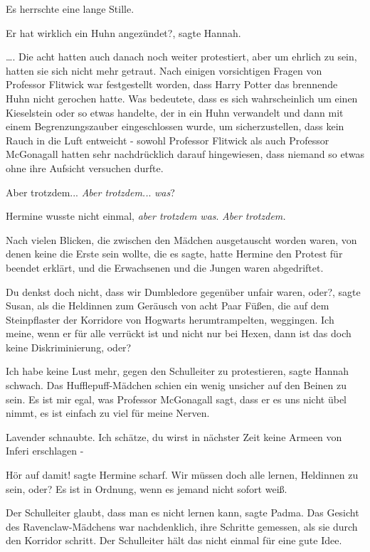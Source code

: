 Es herrschte eine lange Stille.

\glqq Er hat wirklich ein Huhn angezündet?\grqq{}, sagte Hannah.

…. Die acht hatten auch danach noch weiter protestiert, aber um ehrlich zu sein,
hatten sie sich nicht mehr getraut. Nach einigen vorsichtigen Fragen von
Professor Flitwick war festgestellt worden, dass Harry Potter das brennende Huhn
nicht gerochen hatte. Was bedeutete, dass es sich wahrscheinlich um einen
Kieselstein oder so etwas handelte, der in ein Huhn verwandelt und dann mit
einem Begrenzungszauber eingeschlossen wurde, um sicherzustellen, dass kein
Rauch in die Luft entweicht - sowohl Professor Flitwick als auch Professor
McGonagall hatten sehr nachdrücklich darauf hingewiesen, dass niemand so etwas
ohne ihre Aufsicht versuchen durfte.

Aber trotzdem... \emph{Aber trotzdem..}. \emph{was}?

Hermine wusste nicht einmal, \emph{aber trotzdem was}.
\emph{Aber trotzdem.}

Nach vielen Blicken, die zwischen den Mädchen ausgetauscht worden waren, von
denen keine die Erste sein wollte, die es sagte, hatte Hermine den Protest für
beendet erklärt, und die Erwachsenen und die Jungen waren abgedriftet.

\glqq Du denkst doch nicht, dass wir Dumbledore gegenüber unfair waren,
oder?\grqq{}, sagte Susan, als die Heldinnen zum Geräusch von acht Paar Füßen,
die auf dem Steinpflaster der Korridore von Hogwarts herumtrampelten, weggingen.
\glqq Ich meine, wenn er für alle verrückt ist und nicht nur bei Hexen, dann ist
das doch keine Diskriminierung, oder?\grqq{}

\glqq Ich habe keine Lust mehr, gegen den Schulleiter zu protestieren\grqq{},
sagte Hannah schwach. Das Hufflepuff-Mädchen schien ein wenig unsicher auf den
Beinen zu sein. \glqq Es ist mir egal, was Professor McGonagall sagt, dass er es
uns nicht übel nimmt, es ist einfach zu viel für meine Nerven.\grqq{}

Lavender schnaubte. \glqq Ich schätze, du wirst in nächster Zeit keine Armeen
von Inferi erschlagen -\grqq{}

\glqq Hör auf damit!\grqq{} sagte Hermine scharf. \glqq Wir müssen doch alle
lernen, Heldinnen zu sein, oder? Es ist in Ordnung, wenn es jemand nicht sofort
weiß.\grqq{}

\glqq Der Schulleiter glaubt, dass man es nicht lernen kann\grqq{}, sagte Padma.
Das Gesicht des Ravenclaw-Mädchens war nachdenklich, ihre Schritte gemessen, als
sie durch den Korridor schritt. \glqq Der Schulleiter hält das nicht einmal für
eine gute Idee.\grqq{}

